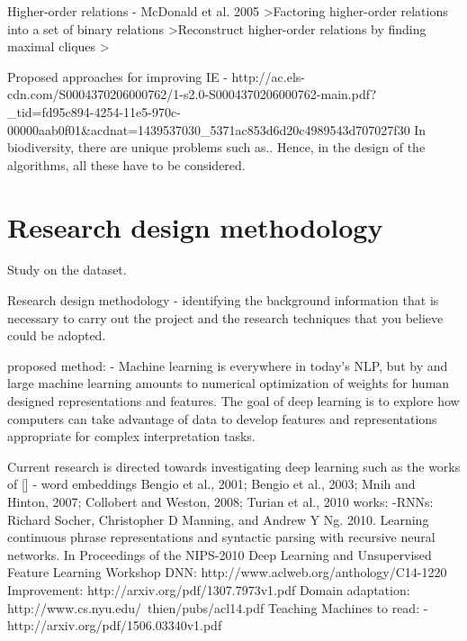 \documentclass[12pt]{article}
\begin{document}
Higher-order relations
- McDonald et al. 2005
>Factoring higher-order relations into a set of binary relations
>Reconstruct higher-order relations
by finding maximal cliques
>


Proposed approaches for improving IE
- http://ac.els-cdn.com/S0004370206000762/1-s2.0-S0004370206000762-main.pdf?_tid=fd95c894-4254-11e5-970c-00000aab0f01&acdnat=1439537030_5371ac853d6d20c4989543d707027f30
In biodiversity, there are unique problems such as..
Hence, in the design of the algorithms, all these have to be considered. 


\section{Research design  methodology}
\label{ch:proposal}


Study on the dataset. 

Research design  methodology - identifying the background information that is necessary to carry out the project and the research techniques that you believe could be adopted.

proposed method:
- Machine learning is everywhere in today's NLP, but by and large machine learning amounts to numerical optimization of weights for human designed representations and features. The goal of deep learning is to explore how computers can take advantage of data to develop features and representations appropriate for complex interpretation tasks. 

Current research is directed towards investigating deep learning such as the works of []
- word embeddings Bengio et al., 2001; Bengio
et al., 2003; Mnih and Hinton, 2007; Collobert
and Weston, 2008; Turian et al., 2010
works:
-RNNs:
Richard Socher, Christopher D Manning, and Andrew Y
Ng. 2010. Learning continuous phrase representations
and syntactic parsing with recursive neural networks.
In Proceedings of the NIPS-2010 Deep Learning
and Unsupervised Feature Learning Workshop
DNN:
 http://www.aclweb.org/anthology/C14-1220
Improvement:
 http://arxiv.org/pdf/1307.7973v1.pdf
 Domain adaptation:
 http://www.cs.nyu.edu/~thien/pubs/acl14.pdf
Teaching Machines to read:
- http://arxiv.org/pdf/1506.03340v1.pdf

 

\end{document}
